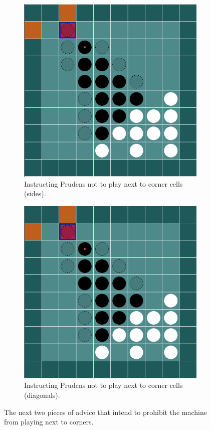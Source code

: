 \documentclass[a4paper,11pt]{article}
\theoremstyle{definition}
\theoremstyle{remark}
\numberwithin{equation}{section}
\begin{document}
	\begin{figure}[!htb]
		\centering\hfill
		\begin{subfigure}{0.48\textwidth}
			\centering
			\includegraphics[width = \textwidth]{../assets/advice_002.png}
			\caption{Instructing Prudens not to play next to corner cells (sides).}
			\label{fig:201a}
		\end{subfigure}\hfill
		\begin{subfigure}{0.48\textwidth}
			\centering
			\includegraphics[width = \textwidth]{../assets/advice_002.png}
			\caption{Instructing Prudens not to play next to corner cells (diagonals).}
			\label{fig:201b}
		\end{subfigure}\hfill
		\caption{The next two pieces of advice that intend to prohibit the machine from playing next to corners.}
		\label{fig:201}
	\end{figure}
\end{document}
